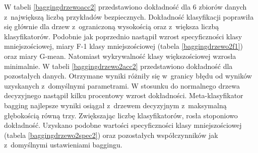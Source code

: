 W tabeli \ref{baggingdrzewoacc2} przedstawiono dokładność dla 6 zbiorów danych z~największą liczbą przykładów bezpiecznych. Dokładność klasyfikacji poprawiła się głównie dla drzew z~ograniczoną wysokością oraz z~większa liczbą klasyfikatorów. 
Podobnie jak poprzednio nastąpił wzrost specyficzności klasy mniejszościowej, miary F-1 klasy mniejszościowej (tabela \ref{baggingdrzewo2f1}) oraz miary G-mean. Natomiast wykrywalność klasy większościowej wzrosła minimalnie. W tabeli \ref{baggingdrzewo2acc2} przedstawiono dokładność dla pozostałych danych. Otrzymane wyniki różniły się w~granicy błędu od wyników uzyskanych z~domyślnymi parametrami. W stosunku do normalnego drzewa decyzyjnego nastąpił kilku procentowy wzrost dokładności. Meta-klasyfikator bagging najlepsze wyniki osiągał z~drzewem decyzyjnym z~maksymalną głębokością równą trzy. Zwiększając liczbę klasyfikatorów, rosła stoponiowo dokładność. Uzyskano podobne wartości specyficzności klasy mniejszościowej (tabela \ref{baggingdrzewo2spec2}) oraz pozostałych współczynników jak z~domyślnymi ustawieniami baggingu.

